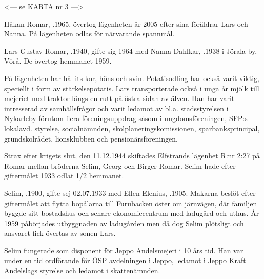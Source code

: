 <--- se KARTA nr 3 --->







Håkan Romar, .1965, övertog lägenheten år 2005 efter sina föräldrar Lars och Nanna. På lägenheten odlas för närvarande spannmål.


Lars Gustav Romar, .1940, gifte sig 1964 med Nanna Dahlkar, .1938 i Jörala by, Vörå. De övertog hemmanet 1959.
\begin{jhchildren}
  \item {}
  \item {}
\end{jhchildren}

På lägenheten har hållits kor, höns och svin. Potatisodling har också varit viktig, speciellt i form av stärkelsepotatis. Lars transporterade också i unga år mjölk till mejeriet med traktor längs en rutt på östra sidan av älven. Han har varit intresserad av samhällsfrågor och varit ledamot av bl.a. stadsstyrelsen i Nykarleby förutom flera föreningsuppdrag såsom i ungdomsföreningen, SFP:s lokalavd. styrelse, socialnämnden, skolplaneringskomissionen, sparbanksprincipal, grundskolrådet, lionsklubben och pensionärsföreningen.



Strax efter krigets slut, den 11.12.1944 skiftades Elfstrands lägenhet R:nr 2:27 på Romar mellan bröderna Selim, Georg och Birger Romar. Selim hade efter giftermålet 1933 odlat 1/2 hemmanet.

Selim, .1900, gifte sej 02.07.1933 med Ellen Elenius, .1905. Makarna beslöt efter giftermålet att flytta bopålarna till Furubacken öster om järnvägen, där familjen byggde sitt bostadshus och senare ekonomiecentrum med ladugård och uthus. År 1959 påbörjades utbyggnaden av ladugården men då dog Selim plötsligt och ansvaret fick övertas av sonen Lars.

Selim fungerade som disponent för Jeppo Andelsmejeri i 10 års tid. Han var under en tid ordförande för ÖSP avdelningen i Jeppo, ledamot i Jeppo Kraft Andelslags styrelse och ledamot i skattenämnden.
\begin{jhchildren}
  \item {}
  \item {}
\end{jhchildren}


